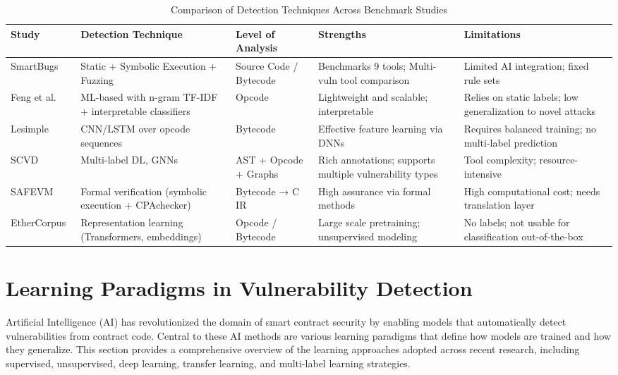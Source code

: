 \begin{table}[H]
\centering
\renewcommand{\arraystretch}{1.3}
\begin{tabular}{|p{3.2cm}|p{2.8cm}|p{2.4cm}|p{3.3cm}|p{2.8cm}|}
\hline
\textbf{Study} & \textbf{Detection Technique} & \textbf{Level of Analysis} & \textbf{Strengths} & \textbf{Limitations} \\ \hline

SmartBugs~\cite{durieux2020empirical} & Static + Symbolic Execution + Fuzzing & Source Code / Bytecode & Benchmarks 9 tools; Multi-vuln tool comparison & Limited AI integration; fixed rule sets \\ \hline

Feng et al.~\cite{feng2024interpretable} & ML-based with n-gram TF-IDF + interpretable classifiers & Opcode & Lightweight and scalable; interpretable & Relies on static labels; low generalization to novel attacks \\ \hline

Lesimple~\cite{lesimple2020master} & CNN/LSTM over opcode sequences & Bytecode & Effective feature learning via DNNs & Requires balanced training; no multi-label prediction \\ \hline

SCVD~\cite{zhang2020scvd} & Multi-label DL, GNNs & AST + Opcode + Graphs & Rich annotations; supports multiple vulnerability types & Tool complexity; resource-intensive \\ \hline

SAFEVM~\cite{albert2019safevm} & Formal verification (symbolic execution + CPAchecker) & Bytecode → C IR & High assurance via formal methods & High computational cost; needs translation layer \\ \hline

EtherCorpus~\cite{tann2020towards} & Representation learning (Transformers, embeddings) & Opcode / Bytecode & Large scale pretraining; unsupervised modeling & No labels; not usable for classification out-of-the-box \\ \hline

\end{tabular}
\caption{Comparison of Detection Techniques Across Benchmark Studies}
\label{tab:detection_comparison}
\end{table}

\section{Learning Paradigms in Vulnerability Detection}
Artificial Intelligence (AI) has revolutionized the domain of smart contract security by enabling models that automatically detect vulnerabilities from contract code. Central to these AI methods are various learning paradigms that define how models are trained and how they generalize. This section provides a comprehensive overview of the learning approaches adopted across recent research, including supervised, unsupervised, deep learning, transfer learning, and multi-label learning strategies.

